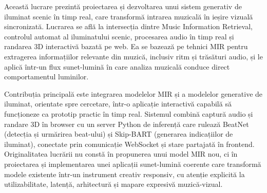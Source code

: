 \documentclass[12pt]{report}
\begin{document}
Această lucrare prezintă proiectarea și dezvoltarea unui sistem generativ de iluminat scenic în timp real, care transformă intrarea muzicală în ieșire vizuală sincronizată. Lucrarea se află la intersecția dintre Music Information Retrieval, controlul automat al iluminatului scenic, procesarea audio în timp real și randarea 3D interactivă bazată pe web. Ea se bazează pe tehnici MIR pentru extragerea informațiilor relevante din muzică, inclusiv ritm și trăsături audio, și le aplică într-un flux sunet-lumină în care analiza muzicală conduce direct comportamentul luminilor.

Contribuția principală este integrarea modelelor MIR și a modelelor generative de iluminat, orientate spre cercetare, într-o aplicație interactivă capabilă să funcționeze ca prototip practic în timp real. Sistemul combină captură audio și randare 3D în browser cu un server Python de inferență care rulează BeatNet (detecția și urmărirea beat-ului) și Skip-BART (generarea indicațiilor de iluminat), conectate prin comunicație WebSocket și stare partajată în frontend. Originalitatea lucrării nu constă în propunerea unui model MIR nou, ci în proiectarea și implementarea unei aplicații sunet-lumină coerente care transformă modele existente într-un instrument creativ responsiv, cu atenție explicită la utilizabilitate, latență, arhitectură și mapare expresivă muzică-vizual.



\setcounter{tocdepth}{1}
\tableofcontents

\newpage
{}








\end{document}
